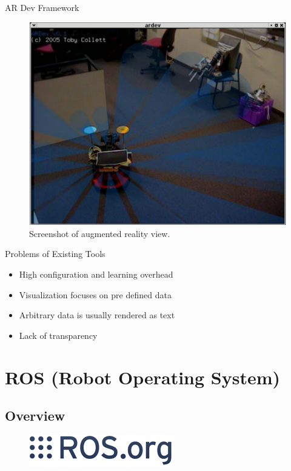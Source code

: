 \documentclass[compress]{beamer}
\begin{document}
\begin{frame}{AR Dev Framework}
\begin{figure}[htbp]
  \centering
  \includegraphics[width=.6\textwidth]{images/ar_view.png}
  \caption{Screenshot of augmented reality view. \cite{Collett2007}}
\end{figure}
\end{frame}

\begin{frame}{Problems of Existing Tools}
\begin{itemize}
\item High configuration and learning overhead
\item Visualization focuses on pre defined data
\item Arbitrary data is usually rendered as text
\item Lack of transparency
\end{itemize}
\end{frame}

\section{ROS (Robot Operating System)}

\subsection{Overview}

\begin{frame}
\begin{figure}[htbp]
  \centering
  \includegraphics[width=.4\textwidth]{images/ros_logo.png}
\end{figure}
\end{frame}
\end{document}
